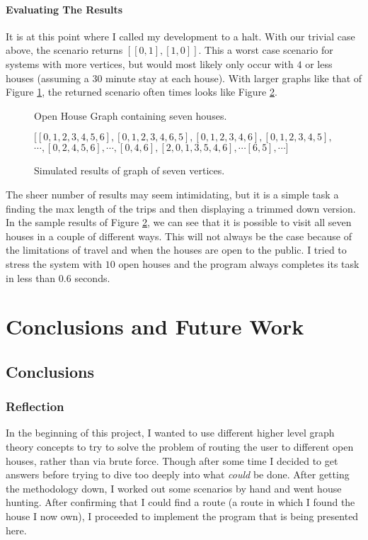 \documentclass[letterpaper,11pt]{report}
\theoremstyle{definition}
\theoremstyle{definition}
\begin{document}
\subsubsection{Evaluating The Results}
It is at this point where I called my development to a halt. With our trivial case above, the scenario returns $[[0,1], [1,0]]$. This a worst case scenario for systems with more vertices, but would most likely only occur with $4$ or less houses (assuming a $30$ minute stay at each house). With larger graphs like that of Figure \ref{seven-houses}, the returned scenario often times looks like Figure \ref{seven-houses-results}.
\begin{figure}[!htb]
  \begin{center}
    
    \caption{Open House Graph containing seven houses.}\label{seven-houses}
  \end{center}
\end{figure}
\begin{figure}
  \begin{center}
    $[[0, 1, 2, 3, 4, 5, 6], [0, 1, 2, 3, 4, 6, 5], [0, 1, 2, 3, 4, 6], [0, 1, 2, 3, 4, 5],$\\ $\cdots, [0, 2, 4, 5, 6], \cdots, [0, 4, 6], [2, 0, 1, 3, 5, 4, 6], \cdots [6, 5], \cdots]$
  \end{center}
  \caption{Simulated results of graph of seven vertices.}\label{seven-houses-results}
\end{figure}

The sheer number of results may seem intimidating, but it is a simple task a finding the max length of the trips and then displaying a trimmed down version. In the sample results of Figure \ref{seven-houses-results}, we can see that it is possible to visit all seven houses in a couple of different ways. This will not always be the case because of the limitations of travel and when the houses are open to the public. I tried to stress the system with $10$ open houses and the program always completes its task in less than $0.6$ seconds.

\chapter{Conclusions and Future Work}
\section{Conclusions}
\subsection{Reflection}
In the beginning of this project, I wanted to use different higher level graph theory concepts to try to solve the problem of routing the user to different open houses, rather than via brute force. Though after some time I decided to get answers before trying to dive too deeply into what \textit{could} be done. After getting the methodology down, I worked out some scenarios by hand and went house hunting. After confirming that I could find a route (a route in which I found the house I now own), I proceeded to implement the program that is being presented here.
\end{document}
